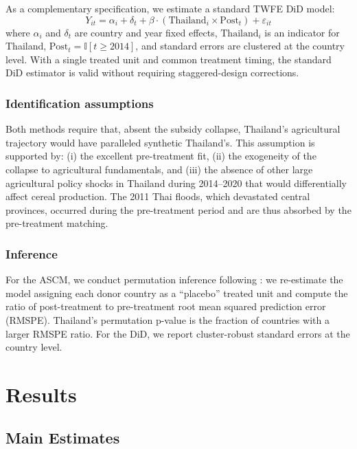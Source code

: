 \documentclass[12pt]{article}
\newcommand{\ind}{\mathbb{I}}
\begin{document}
As a complementary specification, we estimate a standard TWFE DiD model:
\begin{equation}
Y_{it} = \alpha_i + \delta_t + \beta \cdot (\text{Thailand}_i \times \text{Post}_t) + \varepsilon_{it}
\end{equation}
where $\alpha_i$ and $\delta_t$ are country and year fixed effects, $\text{Thailand}_i$ is an indicator for Thailand, $\text{Post}_t = \ind[t \geq 2014]$, and standard errors are clustered at the country level. With a single treated unit and common treatment timing, the standard DiD estimator is valid without requiring staggered-design corrections.

\subsubsection*{Identification assumptions} Both methods require that, absent the subsidy collapse, Thailand's agricultural trajectory would have paralleled synthetic Thailand's. This assumption is supported by: (i) the excellent pre-treatment fit, (ii) the exogeneity of the collapse to agricultural fundamentals, and (iii) the absence of other large agricultural policy shocks in Thailand during 2014--2020 that would differentially affect cereal production. The 2011 Thai floods, which devastated central provinces, occurred during the pre-treatment period and are thus absorbed by the pre-treatment matching.

\subsubsection*{Inference} For the ASCM, we conduct permutation inference following \citet{abadie2010}: we re-estimate the model assigning each donor country as a ``placebo'' treated unit and compute the ratio of post-treatment to pre-treatment root mean squared prediction error (RMSPE). Thailand's permutation p-value is the fraction of countries with a larger RMSPE ratio. For the DiD, we report cluster-robust standard errors at the country level.

\section{Results}\label{sec:results}

\subsection{Main Estimates}
\end{document}
